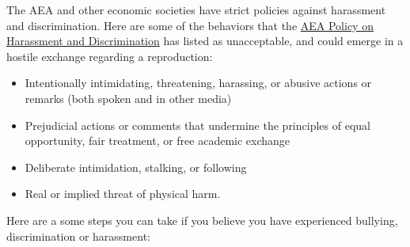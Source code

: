 \documentclass[]{book}
\providecommand{\tightlist}{%
  \setlength{\itemsep}{0pt}\setlength{\parskip}{0pt}}
\begin{document}
The AEA and other economic societies have strict policies against harassment and discrimination. Here are some of the behaviors that the \href{https://www.aeaweb.org/about-aea/aea-policy-harassment-discrimination}{AEA Policy on Harassment and Discrimination} has listed as unacceptable, and could emerge in a hostile exchange regarding a reproduction:

\begin{itemize}
\tightlist
\item
  Intentionally intimidating, threatening, harassing, or abusive actions or remarks (both spoken and in other media)
\item
  Prejudicial actions or comments that undermine the principles of equal opportunity, fair treatment, or free academic exchange
\item
  Deliberate intimidation, stalking, or following
\item
  Real or implied threat of physical harm.
\end{itemize}

Here are a some steps you can take if you believe you have experienced bullying, discrimination or harassment:
\end{document}
